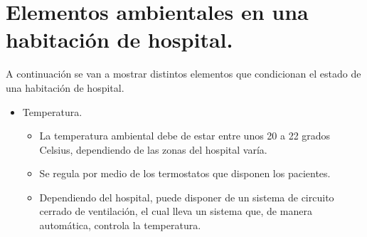 \clearpage

\section{Elementos ambientales en una habitación de hospital.}
\label{sec:elementosAmbientalesHabitacion}
    A continuación se van a mostrar distintos elementos que condicionan el estado de una habitación de hospital.

    \begin{itemize}
    	\item Temperatura.
    		\begin{itemize}
    			\item La temperatura ambiental debe de estar entre unos 20 a 22 grados Celsius, dependiendo de las zonas del hospital varía.\cite{Calidad_Temperatura}
    			\item Se regula por medio de los termostatos que disponen los pacientes.\cite{Calidad_Temperatura}
    			\item Dependiendo del hospital, puede disponer de un sistema de circuito cerrado de ventilación, el cual lleva un sistema que, de manera automática, controla la temperatura.\cite{Calidad_Temperatura}
    		\end{itemize}
    		

\end{itemize}
